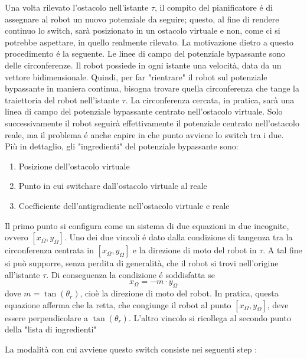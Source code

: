 \documentclass[14pt,a4paper]{extarticle}
\begin{document}
Una volta rilevato l'ostacolo nell'istante \(\tau\), il compito del pianificatore é di assegnare al robot un nuovo potenziale da seguire; questo, al fine di rendere continuo lo switch, sarà posizionato in un ostacolo virtuale e non, come ci si potrebbe aspettare, in quello realmente rilevato. La motivazione dietro a questo procedimento é la seguente. Le linee di campo del potenziale bypassante sono delle circonferenze. Il robot possiede in ogni istante una velocità, data da un vettore bidimensionale. Quindi, per far "rientrare" il robot sul potenziale bypassante in maniera continua, bisogna trovare quella circonferenza che tange la traiettoria del robot nell'istante \(\tau\). La circonferenza cercata, in pratica, sarà una linea di campo del potenziale bypassante centrato nell'ostacolo virtuale. Solo successivamente il robot seguirà effettivamente il potenziale centrato nell'ostacolo reale, ma il problema é anche capire in che punto avviene lo switch tra i due.\\
Più in dettaglio, gli "ingredienti" del potenziale bypassante sono:
\begin{enumerate}
\item Posizione dell'ostacolo virtuale
\item Punto in cui switchare dall'ostacolo virtuale al reale
\item Coefficiente dell'antigradiente nell'ostacolo virtuale e reale
\end{enumerate}
Il primo punto si configura come un sistema di due equazioni in due incognite, ovvero \([x_{\Omega}, y_{\Omega}]\). Uno dei due vincoli é dato dalla condizione di tangenza tra la circonferenza centrata in  \([x_{\Omega}, y_{\Omega}]\) e la direzione di moto del robot in \(\tau\). A tal fine si può supporre, senza perdita di generalità, che il robot si trovi nell'origine all'istante \(\tau\). Di conseguenza la condizione é soddisfatta se \[x_{\Omega} = -m\cdot  y_{\Omega}\] dove \(m = \tan(\theta_r)\), cioè la direzione di moto del robot. In pratica, questa equazione afferma che la retta, che congiunge il robot al punto \([x_{\Omega}, y_{\Omega}]\), deve essere perpendicolare a \(\tan(\theta_r)\). L'altro vincolo si ricollega al secondo punto della "lista di ingredienti"



La modalità con cui avviene questo switch consiste nei seguenti step :


	
\end{document}
